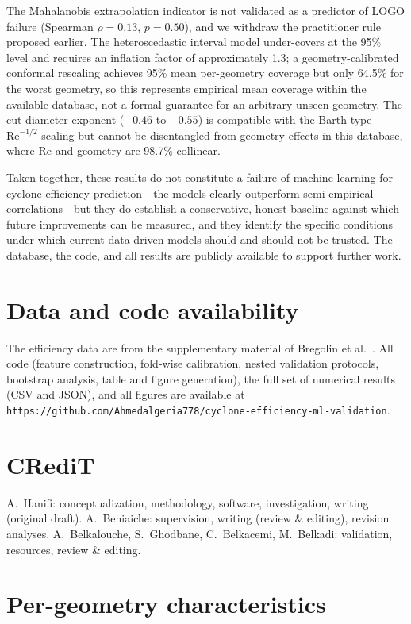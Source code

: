 \documentclass[12pt]{article}
\newcommand{\Rey}{\mathrm{Re}}
\begin{document}
The Mahalanobis extrapolation indicator is not validated as a predictor of LOGO failure (Spearman $\rho = 0.13$, $p = 0.50$), and we withdraw the practitioner rule proposed earlier. The heteroscedastic interval model under-covers at the 95\% level and requires an inflation factor of approximately 1.3; a geometry-calibrated conformal rescaling achieves 95\% mean per-geometry coverage but only 64.5\% for the worst geometry, so this represents empirical mean coverage within the available database, not a formal guarantee for an arbitrary unseen geometry. The cut-diameter exponent ($-0.46$ to $-0.55$) is compatible with the Barth-type $\Rey^{-1/2}$ scaling but cannot be disentangled from geometry effects in this database, where Re and geometry are 98.7\% collinear.

Taken together, these results do not constitute a failure of machine learning for cyclone efficiency prediction---the models clearly outperform semi-empirical correlations---but they do establish a conservative, honest baseline against which future improvements can be measured, and they identify the specific conditions under which current data-driven models should and should not be trusted. The database, the code, and all results are publicly available to support further work.

\section*{Data and code availability}
The efficiency data are from the supplementary material of Bregolin et al.\ \cite{bregolin}. All code (feature construction, fold-wise calibration, nested validation protocols, bootstrap analysis, table and figure generation), the full set of numerical results (CSV and JSON), and all figures are available at\\
\texttt{https://github.com/Ahmedalgeria778/cyclone-efficiency-ml-validation}.

\section*{CRediT}
A.~Hanifi: conceptualization, methodology, software, investigation, writing (original draft). A.~Beniaiche: supervision, writing (review \& editing), revision analyses. A.~Belkalouche, S.~Ghodbane, C.~Belkacemi, M.~Belkadi: validation, resources, review \& editing.

\appendix
\section{Per-geometry characteristics}

\end{document}
